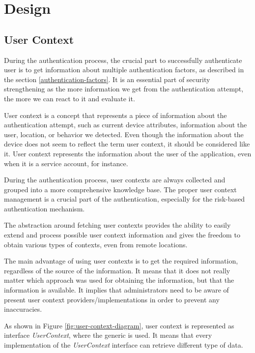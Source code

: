 \chapter{Design}

\section{User Context}
During the authentication process, the crucial part to successfully authenticate user is to get information about multiple authentication factors, as described in the section \ref{authentication-factors}.
It is an essential part of security strengthening as the more information we get from the authentication attempt, the more we can react to it and evaluate it.

User context is a concept that represents a piece of information about the authentication attempt, such as current device attributes, information about the user, location, or behavior we detected.
Even though the information about the device does not seem to reflect the term user context, it should be considered like it.
User context represents the information about the user of the application, even when it is a service account, for instance.

During the authentication process, user contexts are always collected and grouped into a more comprehensive knowledge base.
The proper user context management is a crucial part of the authentication, especially for the risk-based authentication mechanism.

The abstraction around fetching user contexts provides the ability to easily extend and process possible user context information and gives the freedom to obtain various types of contexts, even from remote locations.

The main advantage of using user contexts is to get the required information, regardless of the source of the information.
It means that it does not really matter which approach was used for obtaining the information, but that the information is available.
It implies that administrators need to be aware of present user context providers/implementations in order to prevent any inaccuracies.

\newpage

As shown in Figure \ref{fig:user-context-diagram}, user context is represented as interface \textit{UserContext}, where the generic is used.
It means that every implementation of the \textit{UserContext} interface can retrieve different type of data.

